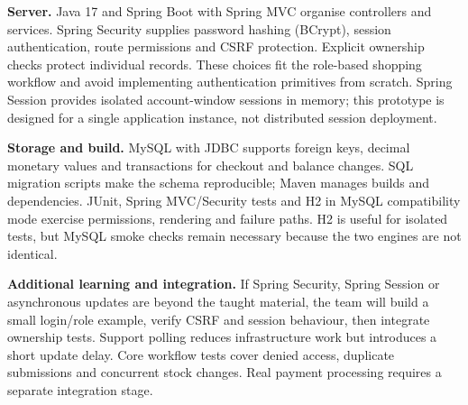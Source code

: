 \documentclass[11pt,a4paper]{article}
\begin{document}
\textbf{Server.} Java 17 and Spring Boot with Spring MVC organise controllers and services. Spring Security supplies password hashing (BCrypt), session authentication, route permissions and CSRF protection. Explicit ownership checks protect individual records. These choices fit the role-based shopping workflow and avoid implementing authentication primitives from scratch. Spring Session provides isolated account-window sessions in memory; this prototype is designed for a single application instance, not distributed session deployment.

\textbf{Storage and build.} MySQL with JDBC supports foreign keys, decimal monetary values and transactions for checkout and balance changes. SQL migration scripts make the schema reproducible; Maven manages builds and dependencies. JUnit, Spring MVC/Security tests and H2 in MySQL compatibility mode exercise permissions, rendering and failure paths. H2 is useful for isolated tests, but MySQL smoke checks remain necessary because the two engines are not identical.

\textbf{Additional learning and integration.} If Spring Security, Spring Session or asynchronous updates are beyond the taught material, the team will build a small login/role example, verify CSRF and session behaviour, then integrate ownership tests. Support polling reduces infrastructure work but introduces a short update delay. Core workflow tests cover denied access, duplicate submissions and concurrent stock changes. Real payment processing requires a separate integration stage.
\end{document}
